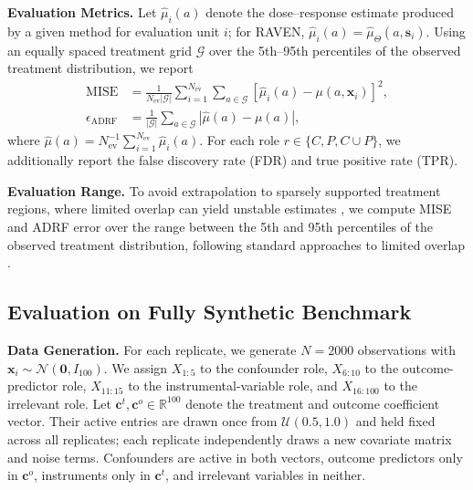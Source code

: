 \documentclass[twoside]{article}
\theoremstyle{plain}
\theoremstyle{definition}
\theoremstyle{remark}
\newtheorem{proof sketch}[theorem]{Proof Sketch}
\begin{document}
\textbf{Evaluation Metrics.}
Let \(\widehat{\mu}_i(a)\) denote the dose--response estimate produced by a given method for evaluation unit \(i\); for RAVEN,
\(\widehat{\mu}_i(a)=\widehat{\mu}_{\Theta}(a,\widehat{\mathbf{s}}_i)\).
Using an equally spaced treatment grid \(\mathcal{G}\) over the 5th--95th percentiles of the observed treatment distribution, we report
\vspace{-1.5em}
\[
\begin{aligned}
\mathrm{MISE}
&=
\frac{1}{N_{\mathrm{ev}}|\mathcal{G}|}
\sum_{i=1}^{N_{\mathrm{ev}}}
\sum_{a\in\mathcal{G}}
\left[
\widehat{\mu}_i(a)-\mu(a,\mathbf{x}_i)
\right]^2,
\\
\epsilon_{\mathrm{ADRF}}
&=
\frac{1}{|\mathcal{G}|}
\sum_{a\in\mathcal{G}}
\left|
\widehat{\mu}(a)-\mu(a)
\right|,
\end{aligned}
\]
where
\(\widehat{\mu}(a)=
N_{\mathrm{ev}}^{-1}
\sum_{i=1}^{N_{\mathrm{ev}}}
\widehat{\mu}_i(a)\).
For each role \(r\in\{C,P,C\cup P\}\), we additionally report the false discovery rate (FDR) and true positive rate (TPR).

\textbf{Evaluation Range.} 
To avoid extrapolation to sparsely supported treatment regions, where limited overlap can yield unstable estimates \citep{petersen2012diagnosing, kennedy2017non}, we compute MISE and ADRF error over the range between the 5th and 95th percentiles of the observed treatment distribution, following standard approaches to limited overlap \cite{crump2009dealing}. 

\subsection{Evaluation on Fully Synthetic Benchmark}
\label{Exp: fully synthetic}
\textbf{Data Generation.}
For each replicate, we generate \(N=2000\) observations with \(\mathbf{x}_i\sim\mathcal{N}(\mathbf{0},I_{100})\).
We assign \(X_{1:5}\) to the confounder role, \(X_{6:10}\) to the outcome-predictor role, \(X_{11:15}\) to the instrumental-variable role, and \(X_{16:100}\) to the irrelevant role. 
Let \(\mathbf{c}^{t},\mathbf{c}^{o}\in\mathbb{R}^{100}\) denote the treatment and outcome coefficient vector. 
Their active entries are drawn once from \(\mathcal{U}(0.5,1.0)\) and held fixed across all replicates; each replicate independently draws a new covariate matrix and noise terms.
Confounders are active in both vectors, outcome predictors only in \(\mathbf{c}^{o}\), instruments only in \(\mathbf{c}^{t}\), and irrelevant variables in neither.
\end{document}
